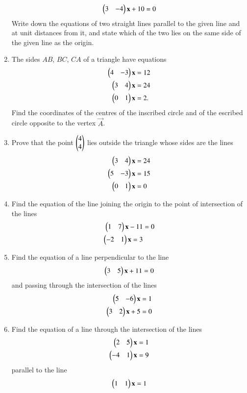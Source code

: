 \begin{enumerate}[label=\arabic*.,ref=\thesubsection.\theenumi]
\begin{align}
\begin{pmatrix}3 &-4\end{pmatrix}\mathbf{x}+10 = 0
\end{align}
Write down the equations of two straight lines parallel to the given line and at unit distances from it,
and state which of the two lies on the same side of the given line as the origin.
\item The sides $AB$, $BC$, $CA$ of a triangle have equations
\begin{align}
\begin{pmatrix}4&-3\end{pmatrix} \mathbf{x}&= 12
\\
\begin{pmatrix} 3 &4\end{pmatrix} \mathbf{x}&= 24
\\
\begin{pmatrix}0 & 1\end{pmatrix} \mathbf{x}&= 2.
\end{align}
Find the coordinates of the centres of the inscribed 
circle and of the escribed circle opposite to the vertex $\vec{A}$.
\\
\solution

\item Prove that the point $\begin{pmatrix}4\\4\end{pmatrix}$ lies outside the triangle whose sides are the lines
\begin{align}
\begin{pmatrix}3&4\end{pmatrix} \mathbf{x}&= 24
\\
\begin{pmatrix} 5 & - 3\end{pmatrix} \mathbf{x}&= 15
\\
\begin{pmatrix}0 &1\end{pmatrix} \mathbf{x}&= 0
\end{align}
\item Find the equation of the line joining the origin to the point of intersection of the lines
\begin{align}
\begin{pmatrix}1&7\end{pmatrix}\mathbf{x} - 11 &= 0
\\
\begin{pmatrix}-2 & 1\end{pmatrix} \mathbf{x}= 3
\end{align}
\item Find the equation of a line perpendicular to the line
\begin{align}
\begin{pmatrix}3&5\end{pmatrix}\mathbf{x}+11 = 0
\end{align}
and passing through the intersection of the lines
\begin{align}
\begin{pmatrix}5 & - 6\end{pmatrix} \mathbf{x}&= 1
\\
\begin{pmatrix} 3&2\end{pmatrix}\mathbf{x}+5 &= 0
\end{align}
\item Find the equation of a line through the intersection of the lines
\begin{align}
\begin{pmatrix}2&5\end{pmatrix} \mathbf{x}&= 1
\\
\begin{pmatrix}-4 & 1\end{pmatrix} \mathbf{x}&= 9
\end{align}
parallel to the line 
\begin{align}
\myvec{1 & 1} \vec{x}= 1

\end{align}
\end{enumerate}
